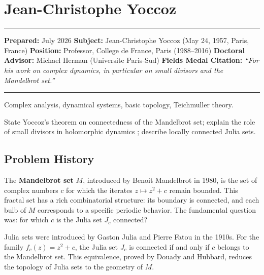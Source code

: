 \chapter{Jean-Christophe Yoccoz}\label{ch1994jeanchristopheyoccoz:jean-christophe-yoccoz-fields-medal-1994-a-comprehensive-report-on-his-work-and-impact}

\begin{center}\rule{0.5\linewidth}{0.5pt}\end{center}

\textbf{Prepared:} July 2026
\textbf{Subject:} Jean-Christophe Yoccoz (May 24, 1957, Paris, France)
\textbf{Position:} Professor, College de France, Paris (1988--2016)
\textbf{Doctoral Advisor:} Michael Herman (Universite Paris-Sud)
\textbf{Fields Medal Citation:} \emph{``For his work on complex dynamics,
in particular on small divisors and the Mandelbrot set.''}

\begin{center}\rule{0.5\linewidth}{0.5pt}\end{center}

\begin{prereqs}
Complex analysis, dynamical systems, basic topology,
Teichmuller theory.
\end{prereqs}

\begin{objectives}
State Yoccoz's theorem on connectedness of the Mandelbrot set;
explain the role of small divisors in holomorphic dynamics \cite{yoccoz1984};
describe locally connected Julia sets.
\end{objectives}

\section{Problem History}

The \textbf{Mandelbrot set} $M$, introduced by Benoit Mandelbrot in
1980, is the set of complex numbers $c$ for which the iterates
$z \mapsto z^2 + c$ remain bounded.  This fractal set has a rich
combinatorial structure: its boundary is connected, and each bulb
of $M$ corresponds to a specific periodic behavior.  The
fundamental question was: for which $c$ is the Julia set $J_c$
connected?

Julia sets were introduced by Gaston Julia and Pierre Fatou in the
1910s.  For the family $f_c(z) = z^2 + c$, the Julia set $J_c$ is
connected if and only if $c$ belongs to the Mandelbrot set.  This
equivalence, proved by Douady and Hubbard, reduces the topology of
Julia sets to the geometry of $M$.

